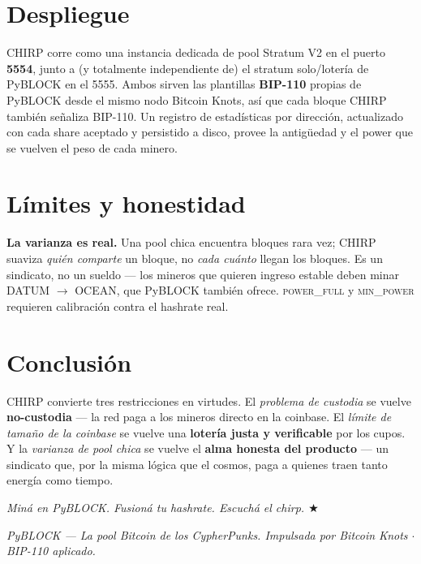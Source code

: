 \documentclass[11pt]{article}
\begin{document}
\section{Despliegue}
CHIRP corre como una instancia dedicada de pool Stratum V2 en el puerto \textbf{5554}, junto a (y
totalmente independiente de) el stratum solo/loter\'ia de PyBLOCK en el 5555. Ambos sirven las
plantillas \textbf{BIP-110} propias de PyBLOCK desde el mismo nodo Bitcoin Knots, as\'i que cada
bloque CHIRP tambi\'en se\~naliza BIP-110. Un registro de estad\'isticas por direcci\'on, actualizado
con cada share aceptado y persistido a disco, provee la antig\"uedad y el power que se vuelven el peso
de cada minero.

\section{L\'imites y honestidad}
\textbf{La varianza es real.} Una pool chica encuentra bloques rara vez; CHIRP suaviza \emph{qui\'en
comparte} un bloque, no \emph{cada cu\'anto} llegan los bloques. Es un sindicato, no un sueldo --- los
mineros que quieren ingreso estable deben minar DATUM $\to$ OCEAN, que PyBLOCK tambi\'en ofrece.
\textsc{power\_full} y \textsc{min\_power} requieren calibraci\'on contra el hashrate real.

\section{Conclusi\'on}
CHIRP convierte tres restricciones en virtudes. El \emph{problema de custodia} se vuelve
\textbf{no-custodia} --- la red paga a los mineros directo en la coinbase. El \emph{l\'imite de tama\~no
de la coinbase} se vuelve una \textbf{loter\'ia justa y verificable} por los cupos. Y la \emph{varianza
de pool chica} se vuelve el \textbf{alma honesta del producto} --- un sindicato que, por la misma
l\'ogica que el cosmos, paga a quienes traen tanto energ\'ia como tiempo.

\begin{center}\itshape
Min\'a en PyBLOCK. Fusion\'a tu hashrate. Escuch\'a el chirp. \quad $\bigstar$
\end{center}

\vfill
\begin{center}\small
\textit{PyBLOCK --- La pool Bitcoin de los CypherPunks. Impulsada por Bitcoin Knots $\cdot$ BIP-110 aplicado.}
\end{center}
\end{document}
